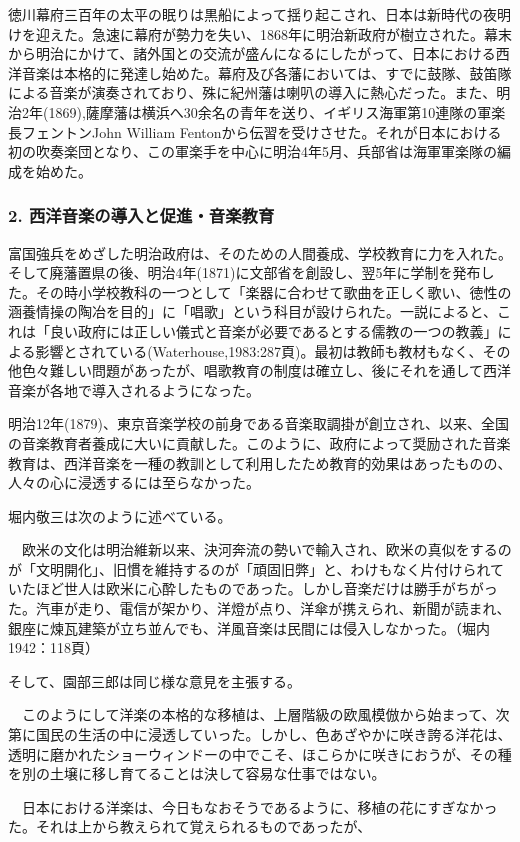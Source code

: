 徳川幕府三百年の太平の眠りは黒船によって揺り起こされ、日本は新時代の夜明けを迎えた。急速に幕府が勢力を失い、1868年に明治新政府が樹立された。幕末から明治にかけて、諸外国との交流が盛んになるにしたがって、日本における西洋音楽は本格的に発達し始めた。幕府及び各藩においては、すでに鼓隊、鼓笛隊による音楽が演奏されており、殊に紀州藩は喇叭の導入に熱心だった。また、明治2年(1869),薩摩藩は横浜へ30余名の青年を送り、イギリス海軍第10連隊の軍楽長フェントンJohn William Fentonから伝習を受けさせた。それが日本における初の吹奏楽団となり、この軍楽手を中心に明治4年5月、兵部省は海軍軍楽隊の編成を始めた。

\subsubsection{2. 西洋音楽の導入と促進・音楽教育}

富国強兵をめざした明治政府は、そのための人間養成、学校教育に力を入れた。そして廃藩置県の後、明治4年(1871)に文部省を創設し、翌5年に学制を発布した。その時小学校教科の一つとして「楽器に合わせて歌曲を正しく歌い、徳性の涵養情操の陶冶を目的」に「唱歌」という科目が設けられた。一説によると、これは「良い政府には正しい儀式と音楽が必要であるとする儒教の一つの教義」による影響とされている(Waterhouse,1983:287頁)。最初は教師も教材もなく、その他色々難しい問題があったが、唱歌教育の制度は確立し、後にそれを通して西洋音楽が各地で導入されるようになった。

明治12年(1879)、東京音楽学校の前身である音楽取調掛が創立され、以来、全国の音楽教育者養成に大いに貢献した。このように、政府によって奨励された音楽教育は、西洋音楽を一種の教訓として利用したため教育的効果はあったものの、人々の心に浸透するには至らなかった。

堀内敬三は次のように述べている。

\begin{gquote}
　欧米の文化は明治維新以来、決河奔流の勢いで輸入され、欧米の真似をするのが「文明開化」、旧慣を維持するのが「頑固旧弊」と、わけもなく片付けられていたほど世人は欧米に心酔したものであった。しかし音楽だけは勝手がちがった。汽車が走り、電信が架かり、洋燈が点り、洋傘が携えられ、新聞が読まれ、銀座に煉瓦建築が立ち並んでも、洋風音楽は民間には侵入しなかった。（堀内1942：118頁）
\end{gquote}

そして、園部三郎は同じ様な意見を主張する。

\begin{gquote}
　このようにして洋楽の本格的な移植は、上層階級の欧風模倣から始まって、次第に国民の生活の中に浸透していった。しかし、色あざやかに咲き誇る洋花は、透明に磨かれたショーウィンドーの中でこそ、ほこらかに咲きにおうが、その種を別の土壌に移し育てることは決して容易な仕事ではない。\par{}　日本における洋楽は、今日もなおそうであるように、移植の花にすぎなかった。それは上から教えられて覚えられるものであったが、
\end{gquote}

